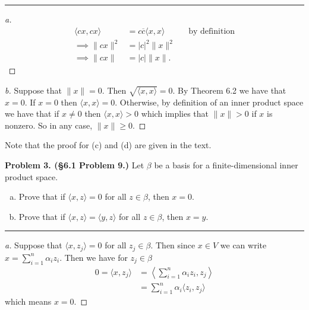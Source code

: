\documentclass[leqno]{article}
\theoremstyle{nonumberplain}
\newtheorem{proof}{Proof}
\begin{document}
\noindent\rule[0.5ex]{\linewidth}{1pt}

\begin{proof}[a]
\begin{align*}
\langle cx,cx \rangle &= c\overline{c} \langle x,x \rangle &&\textrm{by definition}\\
\implies \|cx\|^2 &= |c|^2 \|x\|^2\\
\implies \|cx\|&= |c|\|x\|.
\end{align*}
\end{proof}

\begin{proof}[b]
Suppose that $\|x\|=0$. Then $\sqrt{\langle x,x \rangle} = 0$.  By Theorem 6.2 we have that $x=0$.  If $x=0$ then $\langle x,x\rangle =0$. Otherwise, by definition of an inner product space we have that if $x\neq 0$ then $\langle x,x \rangle >0$ which implies that $\|x\|>0$ if $x$ is nonzero.  So in any case, $\|x\|\geq 0$.
\end{proof}

\noindent Note that the proof for (c) and (d) are given in the text.


\pagebreak




\noindent\textbf{Problem 3. (\S 6.1  Problem 9.)} Let $\beta$ be a basis for a finite-dimensional inner product space.
\begin{enumerate}[(a)]
\item Prove that if $\langle x,z \rangle = 0$ for all $z\in \beta$, then $x=0$.
\item Prove that if $\langle x,z \rangle = \langle y,z \rangle$ for all $z\in \beta$, then $x=y$.
\end{enumerate}

\noindent\rule[0.5ex]{\linewidth}{1pt}

\begin{proof}[a]
Suppose that $\langle x,z_j \rangle =0$ for all $z_j \in \beta$.  Then since $x\in V$ we can write $x=\sum_{i=1}^n \alpha_i z_i$. Then we have for $z_j \in \beta$
\begin{align*}
0=\langle x,z_j \rangle &= \left\langle \sum_{i=1}^n \alpha_i z_i , z_j \right\rangle\\
&= \sum_{i=1}^n \alpha_i \langle z_i, z_j \rangle
\end{align*}
which means $x=0$.
\end{proof}
\end{document}
